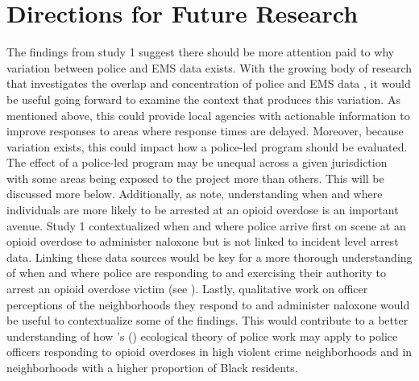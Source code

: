 \section{\centering Directions for Future Research}
The findings from study 1 suggest there should be more attention paid to why variation between police and EMS data exists. With the growing body of research that investigates the overlap and concentration of police and EMS data \parencite{hibdon_use_2024}, it would be useful going forward to examine the context that produces this variation. As mentioned above, this could provide local agencies with actionable information to improve responses to areas where response times are delayed. Moreover, because variation exists, this could impact how a police-led program should be evaluated. The effect of a police-led program may be unequal across a given jurisdiction with some areas being exposed to the project more than others. This will be discussed more below. Additionally, as \textcite{lowder_twoyear_2020} note, understanding when and where individuals are more likely to be arrested at an opioid overdose is an important avenue. Study 1 contextualized when and where police arrive first on scene at an opioid overdose to administer naloxone but is not linked to incident level arrest data. Linking these data sources would be key for a more thorough understanding of when and where police are responding to and exercising their authority to arrest an opioid overdose victim (see \cite{lowder_twoyear_2020}). Lastly, qualitative work on officer perceptions of the neighborhoods they respond to and administer naloxone would be useful to contextualize some of the findings. This would contribute to a better understanding of how \citeauthor{klinger_negotiating_1997}'s (\citeyear{klinger_negotiating_1997}) ecological theory of police work may apply to police officers responding to opioid overdoses in high violent crime neighborhoods and in neighborhoods with a higher proportion of Black residents.


